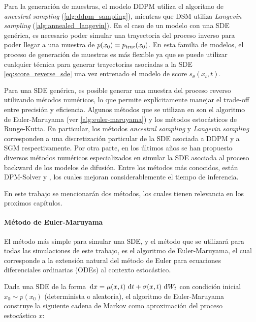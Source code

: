 Para la generación de muestras, el modelo DDPM utiliza el algoritmo de \textit{ancestral sampling} (\autoref{alg:ddpm_sampling}), mientras que DSM utiliza \textit{Langevin sampling} (\autoref{alg:annealed_langevin}). En el caso de un modelo con una SDE genérica, es necesario poder simular una trayectoria del proceso inverso para poder llegar a una muestra de $p(x_0)=p_{\operatorname{true}}(x_0)$. En esta familia de modelos, el proceso de generación de muestras es más flexible ya que se puede utilizar cualquier técnica para generar trayectorias asociadas a la SDE \eqref{eq:score_reverse_sde} una vez entrenado el modelo de score $s_\theta(x_t,t)$.

Para una SDE genérica, es posible generar una muestra del proceso reverso utilizando métodos numéricos, lo que permite explícitamente manejar el trade-off entre precisión y eficiencia. Algunos métodos que se utilizan en \cite{song2021scorebased} son el algoritmo de Euler-Maruyama (ver \autoref{alg:euler-maruyama}) y los métodos estocásticos de Runge-Kutta. En particular, los métodos \textit{ancestral sampling} y \textit{Langevin sampling} corresponden a una discretización particular de la SDE asociada a DDPM y a SGM respectivamente. Por otra parte, en los últimos años se han propuesto diversos métodos numéricos especializados en simular la SDE asociada al proceso backward de los modelos de difusión. Entre los métodos más conocidos, están DPM-Solver \cite{lu2022dpmsolverfastodesolver} y \cite{lu2023dpmsolverfastsolverguided}, los cuales mejoran considerablemente el tiempo de inferencia.

En este trabajo se mencionarán dos métodos, los cuales tienen relevancia en los proxímos capítulos.

\paragraph{Método de Euler-Maruyama}

El método más simple para simular una SDE, y el método que se utilizará para todas las simulaciones de este trabajo, es el algoritmo de Euler-Maruyama, el cual corresponde a la extensión natural del método de Euler para ecuaciones diferenciales ordinarias (ODEs) al contexto estocástico.

Dada una SDE de la forma $\,\operatorname{d}\! x = \mu(x,t)\,\operatorname{d}\! t + \sigma(x,t)\,\operatorname{d}\! W_t$ con condición inicial $x_0\sim p(x_0)$ (determinista o aleatoria), el algoritmo de Euler-Maruyama construye la siguiente cadena de Markov como aproximación del proceso estocástico $x$:

